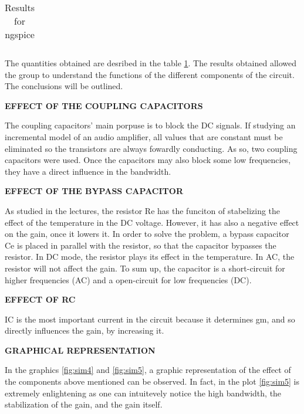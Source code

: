 \begin{enumerate}
\begin{table}[ht]
  \centering
  \begin{tabular}{|l|r|}
    \hline    
    \end{tabular}
  \caption{Results for ngspice}
    \label{tab:results}
\end{table}


The quantities obtained are desribed in the table \ref{tab:results}. The results obtained allowed the group to understand the functions of the different components of the circuit. 
The conclusions will be outlined.


 \textbf{EFFECT OF THE COUPLING CAPACITORS}

The coupling capacitors' main porpuse is to block the DC signals. If studying an incremental model of an audio amplifier, all values that are constant must be eliminated so the transistors are always fowardly conducting. As so, two coupling capacitors were used. Once the capacitors may also block some low frequencies, they have a direct influence in the bandwidth.



 \textbf{EFFECT OF THE BYPASS CAPACITOR}
 
  As studied in the lectures, the resistor Re has the funciton of stabelizing the effect of the temperature in the DC voltage. However, it has also a negative effect on the gain, once it lowers it. In order to solve the problem, a bypass capacitor Ce is placed in parallel with the resistor, so that the capacitor bypasses the resistor. In DC mode, the resistor plays its effect in the temperature. In AC, the resistor will not affect the gain. To sum up, the capacitor is a short-circuit for higher frequencies (AC) and a open-circuit for low frequencies (DC).



 \textbf{EFFECT OF RC}
 
IC is the most important current in the circuit because it determines gm, and so directly influences the gain, by increasing it.

\textbf{GRAPHICAL REPRESENTATION}

In the graphics \ref{fig:sim4} and \ref{fig:sim5}, a graphic representation of the effect of the components above mentioned can be observed. In fact, in the plot \ref{fig:sim5} is extremely enlightening as one can intuitevely notice the high bandwidth, the stabilization of the gain, and the gain itself.





\end{enumerate}
